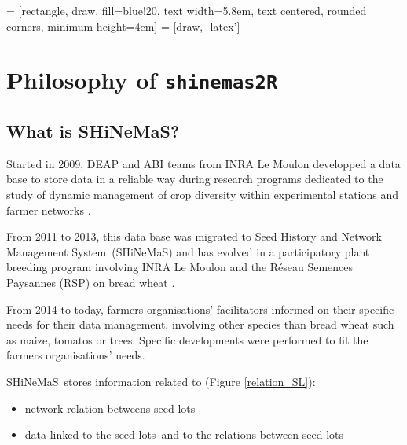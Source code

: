 \documentclass{article}\usepackage[]{graphicx}\usepackage[]{color}
\renewcommand{\sl}{seed-lots}
\newcommand{\BDfull}{Seed History and Network Management System}
\newcommand{\BD}{SHiNeMaS}
\newcommand{\pack}{\texttt{shinemas2R}}
\begin{document}
 = [rectangle, draw, fill=blue!20, text width=5.8em, text centered, rounded corners, minimum height=4em]
 = [draw, -latex']
    




\newpage


\section{Philosophy of \pack}

\subsection{What is \BD?}

Started in 2009, DEAP and ABI teams from INRA Le Moulon developped a data base to store data in a reliable way during research programs dedicated to the study of dynamic management of crop diversity within experimental stations and farmer networks \citep{thomas_gestion_2011}. 

From 2011 to 2013, this data base was migrated to \BDfull~(\BD) and has evolved in a participatory plant breeding program involving INRA Le Moulon and the Réseau Semences Paysannes (RSP) on bread wheat \citep{riviere_methodologie_2014}.

From 2014 to today, farmers organisations' facilitators informed on  their specific needs for their data management, involving other species than bread wheat such as maize, tomatos or trees. Specific developments were performed to fit the farmers organisations' needs. 

\BD~stores information related to (Figure \ref{relation_SL}):
\begin{itemize}
\item network relation betweens \sl
\item data linked to the \sl~and to the relations between \sl
\end{itemize}
\end{document}

